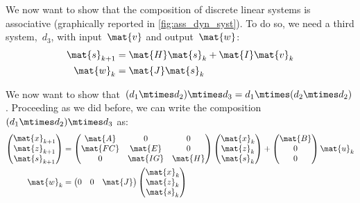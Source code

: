 We now want to show that the composition of discrete linear systems is associative (graphically reported in \cref{fig:ass_dyn_syst}). To do so, we need a third system,~$d_3$, with input~$\mat{v}$ and output~$\mat{w}$:
\begin{equation*}
    \label{eq:dlin-4}
    \begin{aligned}
        \mat{s}_{k+1} &= \mat{H} \mat{s}_k + \mat{I} \mat{v}_k \\
        \mat{w}_{k}   &= \mat{J} \mat{s}_k
    \end{aligned}
\end{equation*}

We now want to show that~$(d_1\mtimes d_2)\mtimes d_3=d_1\mtimes (d_2\mtimes d_2)$.
Proceeding as we did before, we can write the composition~$(d_1\mtimes d_2)\mtimes d_3$ as:
\begin{equation*}
    \label{eq:dlin-5}
    \begin{aligned}
        \begin{pmatrix}
            \mat{x}_{k+1}\\
            \mat{z}_{k+1}\\
            \mat{s}_{k+1}
        \end{pmatrix}&=
        \begin{pmatrix}
            \mat{A}&0&0\\
            \mat{FC}&\mat{E}&0\\
            0&\mat{IG}&\mat{H}
        \end{pmatrix}\begin{pmatrix}
                         \mat{x}_k\\ \mat{z}_k\\ \mat{s}_k
        \end{pmatrix}+
        \begin{pmatrix}
            \mat{B}\\ 0\\ 0
        \end{pmatrix}\mat{u}_k\\
        \mat{w}_k&=\begin{pmatrix}
                       0&0&\mat{J}
        \end{pmatrix}\begin{pmatrix}
                         \mat{x}_k\\ \mat{z}_k\\ \mat{s}_k
        \end{pmatrix}
    \end{aligned}
\end{equation*}
